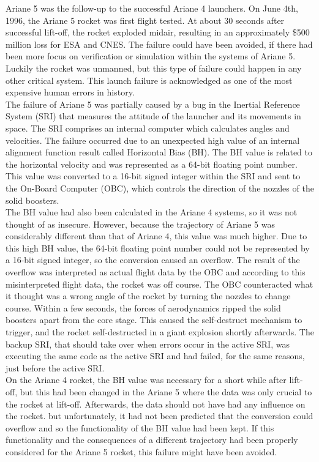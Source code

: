 Ariane 5 was the follow-up to the successful Ariane 4 launchers. On June 4th, 1996, the Ariane 5 rocket was first flight tested. At about 30 seconds after successful lift-off, the rocket exploded midair, resulting in an approximately \$500 million loss for ESA and CNES. The failure could have been avoided, if there had been more focus on verification or simulation within the systems of Ariane 5. Luckily the rocket was unmanned, but this type of failure could happen in any other critical system. This launch failure is acknowledged as one of the most expensive human errors in history. \\

The failure of Ariane 5 was partially caused by a bug in the Inertial Reference System (SRI) that measures the attitude of the launcher and its movements in space. The SRI comprises an internal computer which calculates angles and velocities.
The failure occurred due to an unexpected high value of an internal alignment function result called Horizontal Bias (BH). The BH value is related to the horizontal velocity and was represented as a 64-bit floating point number. This value was converted to a 16-bit signed integer within the SRI and sent to the On-Board Computer (OBC), which controls the direction of the nozzles of the solid boosters.\\

The BH value had also been calculated in the Ariane 4 systems, so it was not thought of as insecure. However, because the trajectory of Ariane 5 was considerably different than that of Ariane 4, this value was much higher. Due to this high BH value, the 64-bit floating point number could not be represented by a 16-bit signed integer, so the conversion caused an overflow.
The result of the overflow was interpreted as actual flight data by the OBC and according to this misinterpreted flight data, the rocket was off course. The OBC counteracted what it thought was a wrong angle of the rocket by turning the nozzles to change course. Within a few seconds, the forces of aerodynamics ripped the solid boosters apart from the core stage. This caused the self-destruct mechanism to trigger, and the rocket self-destructed in a giant explosion shortly afterwards. The backup SRI, that should take over when errors occur in the active SRI, was executing the same code as the active SRI and had failed, for the same reasons, just before the active SRI.\\

On the Ariane 4 rocket, the BH value was necessary for a short while after lift-off, but this had been changed in the Ariane 5 where the data was only crucial to the rocket at lift-off. Afterwards, the data should not have had any influence on the rocket. but unfortunately, it had not been predicted that the conversion could overflow and so the functionality of the BH value had been kept. If this functionality and the consequences of a different trajectory had been properly considered for the Ariane 5 rocket, this failure might have been avoided.
